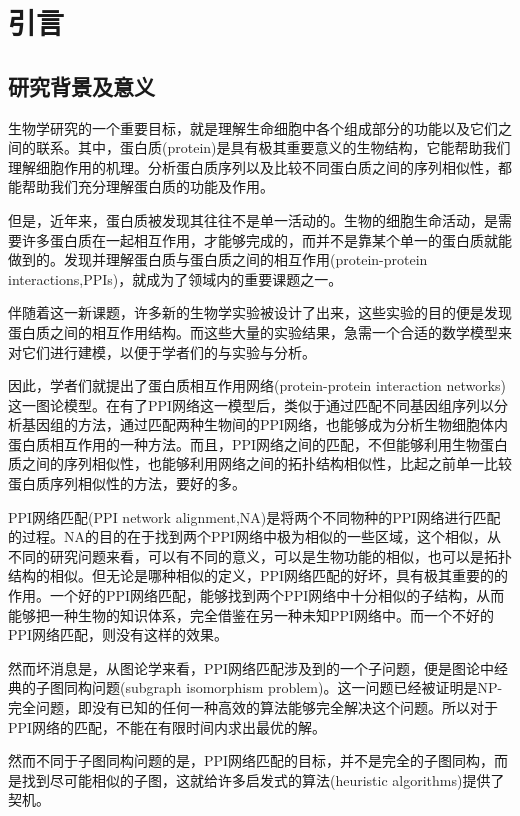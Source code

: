 \chapter{引言}
\section{研究背景及意义}
生物学研究的一个重要目标，就是理解生命细胞中各个组成部分的功能以及它们之间的联系。其中，蛋白质(protein)是具有极其重要意义的生物结构，它能帮助我们理解细胞作用的机理。分析蛋白质序列以及比较不同蛋白质之间的序列相似性，都能帮助我们充分理解蛋白质的功能及作用。

但是，近年来，蛋白质被发现其往往不是单一活动的。生物的细胞生命活动，是需要许多蛋白质在一起相互作用，才能够完成的，而并不是靠某个单一的蛋白质就能做到的。发现并理解蛋白质与蛋白质之间的相互作用(protein-protein interactions,PPIs)，就成为了领域内的重要课题之一。

伴随着这一新课题，许多新的生物学实验\cite{uetz2000comprehensive,ito2001comprehensive,krogan2006global,han2004evidence,nabieva2005whole,yook2004functional}被设计了出来，这些实验的目的便是发现蛋白质之间的相互作用结构。而这些大量的实验结果，急需一个合适的数学模型来对它们进行建模，以便于学者们的与实验与分析。

因此，学者们就提出了蛋白质相互作用网络(protein-protein interaction networks)这一图论模型。在有了PPI网络这一模型后，类似于通过匹配不同基因组序列以分析基因组的方法，通过匹配两种生物间的PPI网络，也能够成为分析生物细胞体内蛋白质相互作用的一种方法。而且，PPI网络之间的匹配，不但能够利用生物蛋白质之间的序列相似性，也能够利用网络之间的拓扑结构相似性，比起之前单一比较蛋白质序列相似性的方法，要好的多。

PPI网络匹配(PPI network alignment,NA)是将两个不同物种的PPI网络进行匹配的过程。NA的目的在于找到两个PPI网络中极为相似的一些区域，这个相似，从不同的研究问题来看，可以有不同的意义，可以是生物功能的相似，也可以是拓扑结构的相似。但无论是哪种相似的定义，PPI网络匹配的好坏，具有极其重要的的作用。一个好的PPI网络匹配，能够找到两个PPI网络中十分相似的子结构，从而能够把一种生物的知识体系，完全借鉴在另一种未知PPI网络中。而一个不好的PPI网络匹配，则没有这样的效果。

然而坏消息是，从图论学来看，PPI网络匹配涉及到的一个子问题，便是图论中经典的子图同构问题(subgraph isomorphism problem)。这一问题已经被证明是NP-完全问题，即没有已知的任何一种高效的算法能够完全解决这个问题。所以对于PPI网络的匹配，不能在有限时间内求出最优的解。

然而不同于子图同构问题的是，PPI网络匹配的目标，并不是完全的子图同构，而是找到尽可能相似的子图，这就给许多启发式的算法(heuristic algorithms)提供了契机。

